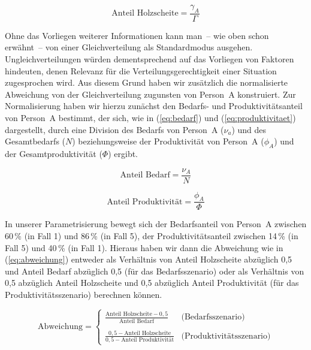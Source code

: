 \documentclass[justified,nobib,symmetric,twoside]{tufte-handout}
\begin{document}
\begin{equation}\label{eq:holz}
   \textrm{Anteil Holzscheite} = \frac{\gamma_{A}}{\Gamma}
\end{equation}

Ohne das Vorliegen weiterer Informationen kann man~-- wie oben schon erwähnt~-- von einer Gleichverteilung als Standardmodus ausgehen.
Ungleichverteilungen würden dementsprechend auf das Vorliegen von Faktoren hindeuten, denen Relevanz für die Verteilungsgerechtigkeit einer Situation zugesprochen wird.
Aus diesem Grund haben wir zusätzlich die normalisierte Abweichung von der Gleichverteilung zugunsten von Person~A konstruiert.
Zur Normalisierung haben wir hierzu zunächst den Bedarfs- und Produktivitätsanteil von Person~A bestimmt, der sich, wie in (\ref{eq:bedarf}) und (\ref{eq:produktivitaet}) dargestellt, durch eine Division des Bedarfs von Person~A ($\nu_{a}$) und des Gesamtbedarfs ($N$) beziehungsweise der Produktivität von Person~A ($\phi_{A}$) und der Gesamtproduktivität ($\Phi$) ergibt.

\begin{equation}\label{eq:bedarf}
   \textrm{Anteil Bedarf} = \frac{\nu_{A}}{N}
\end{equation}

\begin{equation}\label{eq:produktivitaet}
   \textrm{Anteil Produktivität} = \frac{\phi_{A}}{\Phi}
\end{equation}

In unserer Parametrisierung bewegt sich der Bedarfsanteil von Person~A zwischen 60\,\% (in Fall 1) und 86\,\% (in Fall 5), der Produktivitätsanteil zwischen 14\,\% (in Fall 5) und 40\,\% (in Fall 1).
Hieraus haben wir dann die Abweichung wie in (\ref{eq:abweichung}) entweder als Verhältnis von Anteil Holzscheite abzüglich 0,5 und Anteil Bedarf abzüglich 0,5 (für das Bedarfsszenario) oder als Verhältnis von 0,5 abzüglich Anteil Holzscheite und 0,5 abzüglich Anteil Produktivität (für das Produktivitätsszenario) berechnen können.

\begin{equation}\label{eq:abweichung}
   \textrm{Abweichung} = \left\{\begin{array}{ll}\frac{\textrm{Anteil Holzscheite}-0,5}{\textrm{Anteil Bedarf}} & \textrm{(Bedarfsszenario)}\\ \\
   \frac{0,5-\textrm{Anteil Holzscheite}}{0,5-\textrm{Anteil Produktivität}} & \textrm{(Produktivitätsszenario)}
   \end{array}
   \right.
\end{equation}
\end{document}
